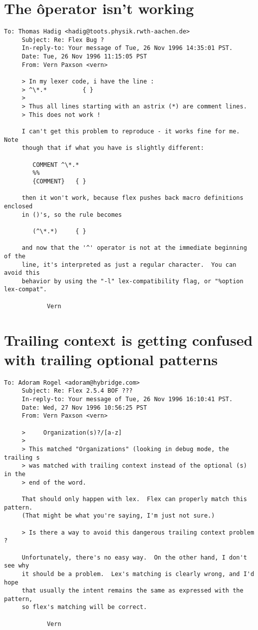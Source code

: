 \documentclass[openany,oneside]{book}
\begin{document}
\section{The \^ operator isn't working}

\begin{verbatim}
To: Thomas Hadig <hadig@toots.physik.rwth-aachen.de>
     Subject: Re: Flex Bug ?
     In-reply-to: Your message of Tue, 26 Nov 1996 14:35:01 PST.
     Date: Tue, 26 Nov 1996 11:15:05 PST
     From: Vern Paxson <vern>
     
     > In my lexer code, i have the line :
     > ^\*.*          { }
     >
     > Thus all lines starting with an astrix (*) are comment lines.
     > This does not work !
     
     I can't get this problem to reproduce - it works fine for me.  Note
     though that if what you have is slightly different:
     
     	COMMENT	^\*.*
     	%%
     	{COMMENT}	{ }
     
     then it won't work, because flex pushes back macro definitions enclosed
     in ()'s, so the rule becomes
     
     	(^\*.*)		{ }
     
     and now that the '^' operator is not at the immediate beginning of the
     line, it's interpreted as just a regular character.  You can avoid this
     behavior by using the "-l" lex-compatibility flag, or "%option lex-compat".
     
     		Vern
\end{verbatim}

\section{Trailing context is getting confused with trailing optional patterns}

\begin{verbatim}
To: Adoram Rogel <adoram@hybridge.com>
     Subject: Re: Flex 2.5.4 BOF ???
     In-reply-to: Your message of Tue, 26 Nov 1996 16:10:41 PST.
     Date: Wed, 27 Nov 1996 10:56:25 PST
     From: Vern Paxson <vern>
     
     >     Organization(s)?/[a-z]
     >
     > This matched "Organizations" (looking in debug mode, the trailing s
     > was matched with trailing context instead of the optional (s) in the
     > end of the word.
     
     That should only happen with lex.  Flex can properly match this pattern.
     (That might be what you're saying, I'm just not sure.)
     
     > Is there a way to avoid this dangerous trailing context problem ?
     
     Unfortunately, there's no easy way.  On the other hand, I don't see why
     it should be a problem.  Lex's matching is clearly wrong, and I'd hope
     that usually the intent remains the same as expressed with the pattern,
     so flex's matching will be correct.
     
     		Vern
\end{verbatim}
\end{document}
